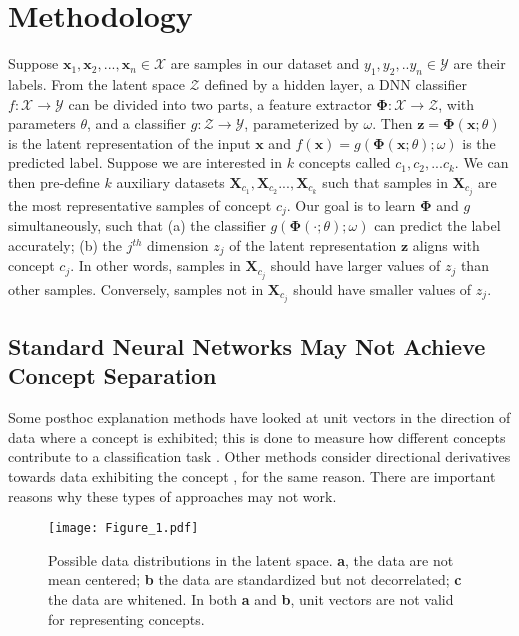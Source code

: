 \documentclass{article}
\begin{document}
\section{Methodology}
\label{sec:methodology}
Suppose $\mathbf{x}_1,\mathbf{x}_2,...,\mathbf{x}_n\in \mathcal{X}$ are samples in our dataset and $y_1,y_2,..y_n\in\mathcal{Y}$ are their labels. From the latent space $\mathcal{Z}$ defined by a hidden layer, a DNN classifier $f:\mathcal{X}\rightarrow\mathcal{Y}$ can be divided into two parts, a feature extractor
$\mathbf{\Phi}:\mathcal{X}\rightarrow\mathcal{Z}$, with parameters $\theta$, and a classifier $g:\mathcal{Z}\rightarrow\mathcal{Y}$, parameterized by $\omega$. Then $\mathbf{z}=\mathbf{\Phi}(\mathbf{x};\theta)$ is the latent representation of the input $\mathbf{x}$ and $f(\mathbf{x})=g(\mathbf{\Phi}(\mathbf{x};\theta);\omega)$ is the predicted label.
Suppose we are interested in $k$ concepts called $c_1,c_2,...c_k$. We can then pre-define $k$ auxiliary datasets $\mathbf{X}_{c_1},\mathbf{X}_{c_2}...,\mathbf{X}_{c_k}$ such that samples in $\mathbf{X}_{c_j}$ are the most representative samples of concept $c_j$. Our goal is to learn $\mathbf{\Phi}$ and $g$ simultaneously, such that (a) the classifier $g(\mathbf{\Phi}(\cdot;\theta);\omega)$ can predict the label accurately; (b) the $j^{th}$ dimension $z_j$ of the latent representation $\mathbf{z}$ aligns with concept $c_j$. In other words, samples in $\mathbf{X}_{c_j}$ should have larger values of $z_j$ than other samples. Conversely, samples not in $\mathbf{X}_{c_j}$ should have smaller values of $z_j$.

\subsection{Standard Neural Networks May Not Achieve Concept Separation} \label{sec:whynotnn}
Some posthoc explanation methods have looked at unit vectors in the direction of data where a concept is exhibited; this is done to measure how different concepts contribute to a classification task \cite{zhou2018interpretable}. Other methods consider directional derivatives towards data exhibiting the concept \cite{kim2018interpretability}, for the same reason. There are important reasons why these types of approaches may not work.

\begin{figure}[htbp]
    \centering
    \texttt{[image: Figure\_1.pdf]}
    \caption{Possible data distributions in the latent space. \textbf{a}, the data are not mean centered; \textbf{b} the data are standardized but not decorrelated; \textbf{c} the data are whitened. In both \textbf{a} and \textbf{b},  unit vectors are not valid for representing concepts. \label{fig:demo}}
\end{figure}
\end{document}
